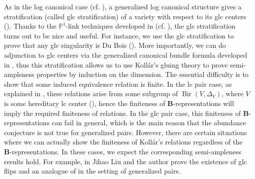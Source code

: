\documentclass[11pt]{amsart}
\numberwithin{equation}{section}
\newcommand{\Mm}{{\bf{M}}}
\newcommand{\Bb}{{\bf{B}}}
\newcommand{\Pp}{\mathbb{P}}
\newcommand{\Bir}{\operatorname{Bir}}
\theoremstyle{definition}
\theoremstyle{definition}
\theoremstyle{definition}
\begin{document}

As in the log canonical case (cf. \cite[Section 5.5]{Kol13}), a generalized log canonical structure gives a stratification (called glc stratification) of a variety with respect to its glc centers (\cite[Section 4]{LX22b}). Thanks to the $\Pp^1$-link techniques developed in \cite[Theorem 1.4]{FS20}(cf. \cite[Theorem 3.5]{Bir20}), the glc stratification turns out to be nice and useful. For instance, we use the glc stratification to prove that any glc singularity is Du Bois (\cite[Section 6]{LX22b}). More importantly, we can do adjunction to glc centers via the generalized canonical bundle formula developed in \cite{Fil20,HL21b,JLX22}, thus this stratification allows us to use Koll\'ar's gluing theory to prove semi-ampleness properties by induction on the dimension. The essential difficulty is to show that some induced equivalence relation is finite. In the lc pair case, as explained in \cite{HX13,HX16}, these relations arise from some subgroup of $\Bir(V,\Delta_V)$, where $V$ is some hereditary lc center (\cite[Definition 5.30]{Kol13}), hence the finiteness of \Bb-representations will imply the required finiteness of relations. In the glc pair case, this finiteness of \Bb-representations can fail in general, which is the main reason that the abundance conjecture is not true for generalized pairs. However, there are certain situations where we can actually show the finiteness of Koll\'ar's relations regardless of the \Bb-representations. In these cases, we expect the corresponding semi-ampleness results hold.
For example, in \cite{LX22b} Jihao Liu and the author prove the existence of glc flips and an analogue of \cite[Theorem 1.1]{HX13} in the setting of generalized pairs. 

\end{document}
